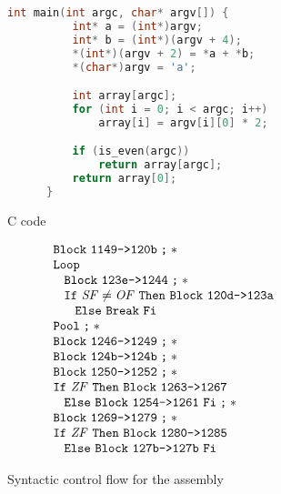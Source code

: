 \begin{figure}
  \begin{subfigure}[b]{.53\linewidth}
    \begin{lstlisting}[language=C, gobble=6]
      int main(int argc, char* argv[]) {
          int* a = (int*)argv;
          int* b = (int*)(argv + 4);
          *(int*)(argv + 2) = *a + *b;
          *(char*)argv = 'a';

          int array[argc];
          for (int i = 0; i < argc; i++)
              array[i] = argv[i][0] * 2;

          if (is_even(argc))
              return array[argc];
          return array[0];
      }
    \end{lstlisting}
    \caption{C code}\label{fig:example2-c}
  \end{subfigure}%
  \hfill
  \begin{subfigure}[b]{.46\linewidth}
    \begin{equation*}
      \begin{array}{l}
        \ABB~\Block{1149}{120b}\ASeq* \\
        \AWhile \\
        \ind{2ex}\ABB~\Block{123e}{1244}\ASeq* \\
        \ind{2ex}\AIf~\var{SF}\neq\var{OF}~\AThen~\ABB~\Block{120d}{123a} \\
        \ind{4ex}\AElse~\ABreak~\AFi \\
        \AOd\ASeq* \\
        \ABB~\Block{1246}{1249}\ASeq* \\
        \ABB~\Block{124b}{124b}\ASeq* \\
        \ABB~\Block{1250}{1252}\ASeq* \\
        \AIf~\var{ZF}~\AThen~\ABB~\Block{1263}{1267} \\
        \ind{2ex}\AElse~\ABB~\Block{1254}{1261}~\AFi\ASeq* \\
        \ABB~\Block{1269}{1279}\ASeq* \\
        \AIf~\var{ZF}~\AThen~\ABB~\Block{1280}{1285} \\
        \ind{2ex}\AElse~\ABB~\Block{127b}{127b}~\AFi
      \end{array}
    \end{equation*}
    \caption{Syntactic control flow for the assembly}\label{fig:example2-scf}
  \end{subfigure}
  \begin{subfigure}{\linewidth}
    \begin{align*}

\end{align*}
\end{subfigure}
\end{figure}
